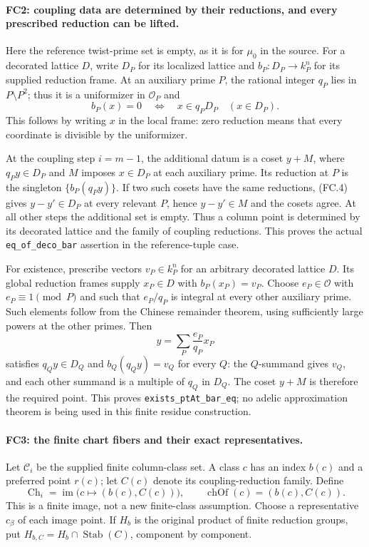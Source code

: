 \documentclass[11pt,a4paper]{article}
\numberwithin{equation}{section}
\theoremstyle{remark}\newtheorem{remark}[theorem]{Remark}
\begin{document}
\paragraph{FC2: coupling data are determined by their reductions, and
every prescribed reduction can be lifted.}
Here the reference twist-prime set is empty, as it is for $\mu_0$ in
the source. For a decorated lattice $D$, write $D_P$ for its localized
lattice and $b_P:D_P\to k_P^n$ for its supplied reduction frame.
At an auxiliary prime $P$, the rational integer $q_P$ lies in
$P\setminus P^2$; thus it is a uniformizer in $\mathcal O_P$ and
\[
 b_P(x)=0\quad\Longleftrightarrow\quad x\in q_P D_P
 \quad(x\in D_P).                                      \tag{FC.4}
\]
This follows by writing $x$ in the local frame: zero reduction means
that every coordinate is divisible by the uniformizer.

At the coupling step $i=m-1$, the additional datum is a coset
$y+M$, where $q_Py\in D_P$ and $M$ imposes $x\in D_P$ at each
auxiliary prime. Its reduction at $P$ is the singleton
$\{b_P(q_Py)\}$. If two such cosets have the same reductions,
(FC.4) gives $y-y'\in D_P$ at every relevant $P$, hence
$y-y'\in M$ and the cosets agree. At all other steps the additional
set is empty. Thus a column point is determined by its decorated
lattice and the family of coupling reductions. This proves the actual
\texttt{eq\_\allowbreak of\_\allowbreak deco\_\allowbreak bar} assertion in the reference-tuple case.

For existence, prescribe vectors $v_P\in k_P^n$ for an arbitrary
decorated lattice $D$. Its global reduction frames supply
$x_P\in D$ with $b_P(x_P)=v_P$. Choose $e_P\in\mathcal O$ with
$e_P\equiv1\pmod P$ and such that $e_P/q_P$ is integral at every
other auxiliary prime. Such elements follow from the Chinese remainder
theorem, using sufficiently large powers at the other primes. Then
\[
 y=\sum_P\frac{e_P}{q_P}x_P                            \tag{FC.5}
\]
satisfies $q_Qy\in D_Q$ and $b_Q(q_Qy)=v_Q$ for every $Q$:
the $Q$-summand gives $v_Q$, and each other summand is a multiple of
$q_Q$ in $D_Q$. The coset $y+M$ is therefore the required point.
This proves \texttt{exists\_\allowbreak ptAt\_\allowbreak bar\_\allowbreak eq}; no adelic approximation
theorem is being used in this finite residue construction.

\paragraph{FC3: the finite chart fibers and their exact representatives.}
Let $\mathscr C_i$ be the supplied finite column-class set. A class
$c$ has an index $b(c)$ and a preferred point $r(c)$; let
$C(c)$ denote its coupling-reduction family. Define
\[
 \operatorname{Ch}_i=\operatorname{im}
       \bigl(c\mapsto(b(c),C(c))\bigr),\qquad
 \operatorname{chOf}(c)=(b(c),C(c)).                     \tag{FC.6}
\]
This is a finite image, not a new finite-class assumption. Choose a
representative $c_\beta$ of each image point. If $H_b$ is the original
product of finite reduction groups, put
$H_{b,C}=H_b\cap\operatorname{Stab}(C)$, component by component.
\end{document}
